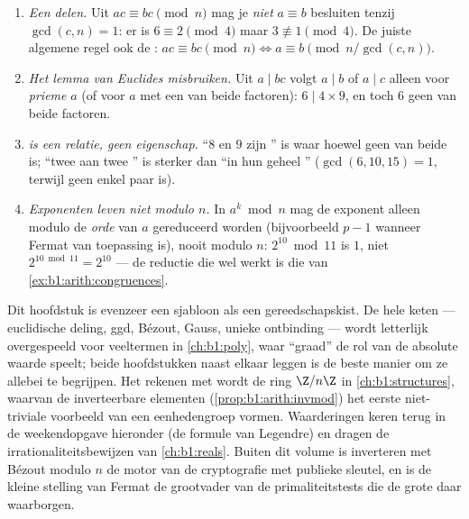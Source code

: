 \begin{remark}\label{rem:b1:arith:pitfalls}
\begin{enumerate}
  \item \emph{Een  delen.} Uit $ac \equiv bc \pmod n$ mag je
        \emph{niet} $a \equiv b$ besluiten tenzij $\gcd(c, n) = 1$: er
        is $6 \equiv 2 \pmod 4$ maar $3 \not\equiv 1 \pmod 4$. De juiste
        algemene regel  ook de : $ac \equiv bc \pmod n \iff
        a \equiv b \pmod{n/\gcd(c,n)}$.
  \item \emph{Het lemma van Euclides misbruiken.} Uit $a \mid bc$ volgt
        $a \mid b$ of $a \mid c$ alleen voor \emph{prieme} $a$ (of voor
        $a$  met een van beide factoren): $6 \mid 4 \times
        9$, en toch  $6$ geen van beide factoren.
  \item \emph{ is een relatie, geen eigenschap.} ``$8$ en
        $9$ zijn '' is waar hoewel geen van beide 
        is; ``twee aan twee '' is sterker dan ``in hun
        geheel '' ($\gcd(6, 10, 15) = 1$, terwijl geen
        enkel paar  is).
  \item \emph{Exponenten leven niet modulo $n$.} In $a^k \bmod n$ mag de
        exponent alleen modulo de \emph{orde} van $a$ gereduceerd worden
        (bijvoorbeeld $p - 1$ wanneer Fermat van toepassing is), nooit
        modulo $n$: $2^{10} \bmod 11$ is $1$, niet $2^{10 \bmod 11} =
        2^{10}$ --- de reductie die wel werkt is die van
        \cref{ex:b1:arith:congruences}.
\end{enumerate}
\end{remark}

\begin{remark}\label{rem:b1:arith:whereused}
Dit hoofdstuk is evenzeer een sjabloon als een gereedschapskist. De hele
keten --- euclidische deling, ggd, Bézout, Gauss, unieke ontbinding ---
wordt letterlijk overgespeeld voor veeltermen in \cref{ch:b1:poly}, waar
``graad'' de rol van de absolute waarde speelt; beide hoofdstukken naast
elkaar leggen is de beste manier om ze allebei te begrijpen. Het rekenen
met  wordt de ring $\Z/n\Z$ in \cref{ch:b1:structures},
waarvan de inverteerbare elementen (\cref{prop:b1:arith:invmod}) het
eerste niet-triviale voorbeeld van een eenhedengroep vormen.
Waarderingen keren terug in de weekendopgave hieronder (de formule van
Legendre) en dragen de irrationaliteitsbewijzen van \cref{ch:b1:reals}.
Buiten dit volume is inverteren met Bézout modulo $n$ de motor van de
cryptografie met publieke sleutel, en is de kleine stelling van Fermat de
grootvader van de primaliteitstests die de grote  daar
waarborgen.
\end{remark}


